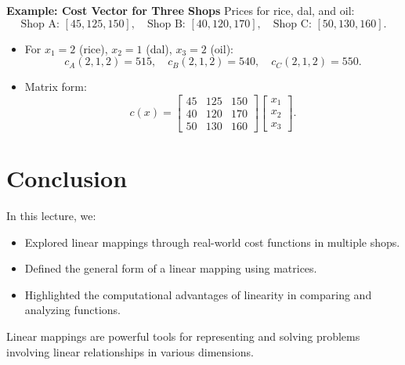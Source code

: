 \documentclass{article}
\begin{document}
\textbf{Example: Cost Vector for Three Shops}
Prices for rice, dal, and oil:
\[
  \text{Shop A: } [45, 125, 150], \quad
  \text{Shop B: } [40, 120, 170], \quad
  \text{Shop C: } [50, 130, 160].
\]
\begin{itemize}
  \item For $x_1 = 2$ (rice), $x_2 = 1$ (dal), $x_3 = 2$ (oil):
    \[
      c_A(2, 1, 2) = 515, \quad c_B(2, 1, 2) = 540, \quad c_C(2, 1, 2) = 550.
    \]
  \item Matrix form:
    \[
      c(x) =
      \begin{bmatrix}
        45 & 125 & 150 \\
        40 & 120 & 170 \\
        50 & 130 & 160
      \end{bmatrix}
      \begin{bmatrix}
        x_1 \\ x_2 \\ x_3
      \end{bmatrix}.
    \]
\end{itemize}

\section*{Conclusion}

In this lecture, we:
\begin{itemize}
  \item Explored linear mappings through real-world cost functions in multiple shops.
  \item Defined the general form of a linear mapping using matrices.
  \item Highlighted the computational advantages of linearity in comparing and analyzing functions.
\end{itemize}

Linear mappings are powerful tools for representing and solving problems involving linear relationships in various dimensions.
\end{document}
